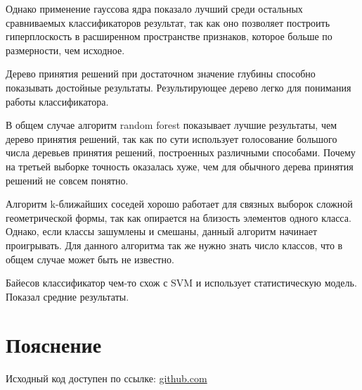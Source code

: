 \documentclass{article} %
\begin{document}
Однако применение гауссова ядра показало лучший среди остальных
сравниваемых классификаторов результат,
так как оно позволяет построить гиперплоскость
в расширенном пространстве признаков,
которое больше по размерности, чем исходное.

Дерево принятия решений
при достаточном значение глубины
способно показывать достойные результаты.
Результирующее дерево легко для понимания
работы классификатора.

В общем случае алгоритм random forest
показывает лучшие результаты,
чем дерево принятия решений,
так как по сути использует
голосование большого числа
деревьев принятия решений,
построенных различными способами.
Почему на третьей выборке
точность оказалась хуже,
чем для обычного дерева принятия решений
не совсем понятно.

Алгоритм k-ближайших соседей хорошо
работает для связных выборок сложной
геометрической формы,
так как опирается на близость элементов
одного класса. Однако, если
классы зашумлены и смешаны,
данный алгоритм начинает проигрывать.
Для данного алгоритма так же нужно знать
число классов, что в общем случае может быть не известно.

Байесов классификатор чем-то схож
с SVM и использует статистическую модель.
Показал средние результаты.

\section{Пояснение}
Исходный код доступен по ссылке:
\href{https://github.com/SvichkarevAnatoly/Course-Python-Bioinformatics/tree/master/semester2/task13}
{github.com}
\end{document}
